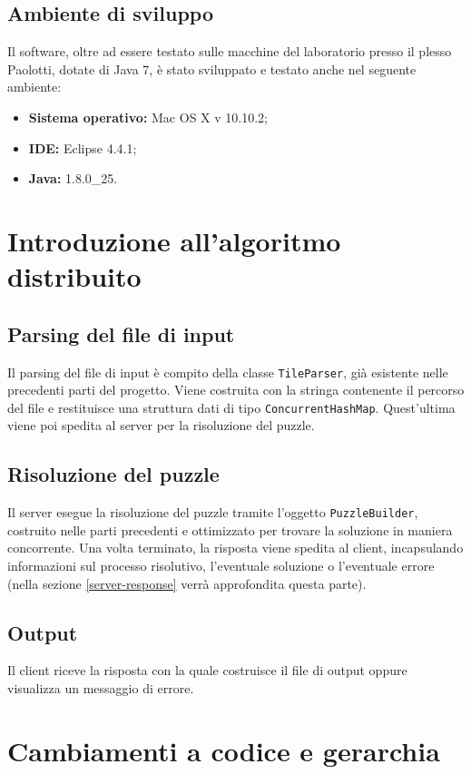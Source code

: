 \documentclass[a4paper, 12pt]{article}
\begin{document}
\subsection{Ambiente di sviluppo}
Il software, oltre ad essere testato sulle macchine del laboratorio presso il
plesso Paolotti, dotate di Java 7, è stato sviluppato e testato anche nel
seguente ambiente:
\begin{itemize}
\item \textbf{Sistema operativo:} Mac OS X v 10.10.2;
\item \textbf{IDE:} Eclipse 4.4.1;
\item \textbf{Java:} 1.8.0\_25.
\end{itemize}

\section{Introduzione all'algoritmo distribuito}
\subsection{Parsing del file di input}
Il parsing del file di input è compito della classe \verb|TileParser|, già
esistente nelle precedenti parti del progetto. Viene costruita con la stringa
contenente il percorso del file e restituisce una struttura dati di tipo
\verb|ConcurrentHashMap|. Quest'ultima viene poi spedita al server
per la risoluzione del puzzle.
\subsection{Risoluzione del puzzle}
Il server esegue la risoluzione del puzzle tramite l'oggetto
\verb|PuzzleBuilder|, costruito nelle parti precedenti e ottimizzato per trovare
la soluzione in maniera concorrente. Una volta terminato, la risposta viene
spedita al client, incapsulando informazioni sul processo risolutivo,
l'eventuale soluzione o l'eventuale errore (nella sezione \ref{server-response}
verrà approfondita questa parte).
\subsection{Output}
Il client riceve la risposta con la quale costruisce il file di output oppure
visualizza un messaggio di errore.

\section{Cambiamenti a codice e gerarchia}
\end{document}
